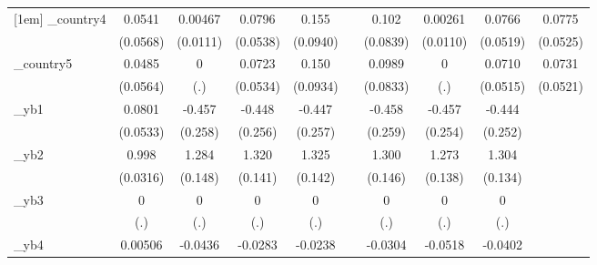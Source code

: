 \begin{table}[htbp]
\begin{tabular}{l*{9}{c}}
[1em]
\_country4   &      0.0541         &     0.00467         &      0.0796         &       0.155\sym{*}  &                     &       0.102         &     0.00261         &      0.0766         &      0.0775         \\
            &    (0.0568)         &    (0.0111)         &    (0.0538)         &    (0.0940)         &                     &    (0.0839)         &    (0.0110)         &    (0.0519)         &    (0.0525)         \\
[1em]
\_country5   &      0.0485         &           0         &      0.0723         &       0.150         &                     &      0.0989         &           0         &      0.0710         &      0.0731         \\
            &    (0.0564)         &         (.)         &    (0.0534)         &    (0.0934)         &                     &    (0.0833)         &         (.)         &    (0.0515)         &    (0.0521)         \\
[1em]
\_yb1        &      0.0801         &      -0.457\sym{*}  &      -0.448\sym{*}  &      -0.447\sym{*}  &                     &      -0.458\sym{*}  &      -0.457\sym{*}  &      -0.444\sym{*}  &                     \\
            &    (0.0533)         &     (0.258)         &     (0.256)         &     (0.257)         &                     &     (0.259)         &     (0.254)         &     (0.252)         &                     \\
[1em]
\_yb2        &       0.998\sym{***}&       1.284\sym{***}&       1.320\sym{***}&       1.325\sym{***}&                     &       1.300\sym{***}&       1.273\sym{***}&       1.304\sym{***}&                     \\
            &    (0.0316)         &     (0.148)         &     (0.141)         &     (0.142)         &                     &     (0.146)         &     (0.138)         &     (0.134)         &                     \\
[1em]
\_yb3        &           0         &           0         &           0         &           0         &                     &           0         &           0         &           0         &                     \\
            &         (.)         &         (.)         &         (.)         &         (.)         &                     &         (.)         &         (.)         &         (.)         &                     \\
[1em]
\_yb4        &     0.00506         &     -0.0436         &     -0.0283         &     -0.0238         &                     &     -0.0304         &     -0.0518         &     -0.0402         &                     \\

\end{tabular}
\end{table}
